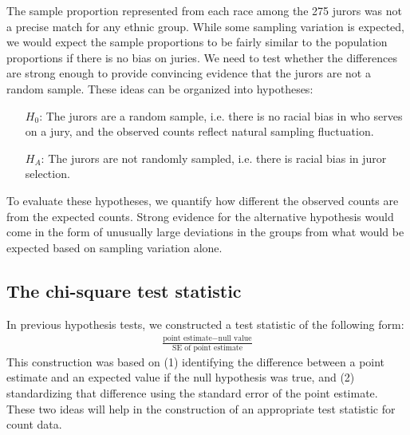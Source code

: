 The sample proportion represented from each race among the 275 jurors was not a precise match for any ethnic group. While some sampling variation is expected, we would expect the sample proportions to be fairly similar to the population proportions if there is no bias on juries. We need to test whether the differences are strong enough to provide convincing evidence that the jurors are not a random sample. These ideas can be organized into hypotheses:
\begin{itemize}
\setlength{\itemsep}{0mm}
\item[$H_0$:] The jurors are a random sample, i.e. there is no racial bias in who serves on a jury, and the observed counts reflect natural sampling fluctuation.
\item[$H_A$:] The jurors are not randomly sampled, i.e. there is racial bias in juror selection.
\end{itemize}
To evaluate these hypotheses, we quantify how different the observed counts are from the expected counts. Strong evidence for the alternative hypothesis would come in the form of unusually large deviations in the groups from what would be expected based on sampling variation alone.


\subsection{The chi-square test statistic}
\label{chiSquareTestStatistic}

In previous hypothesis tests, we constructed a test statistic of the following form:
\begin{align*}
\frac{\text{point estimate} - \text{null value}}
    {\text{SE of point estimate}}
\end{align*}
This construction was based on (1) identifying the difference between a point estimate and an expected value if the null hypothesis was true, and (2) standardizing that difference using the standard error of the point estimate. These two ideas will help in the construction of an appropriate test statistic for count data.

